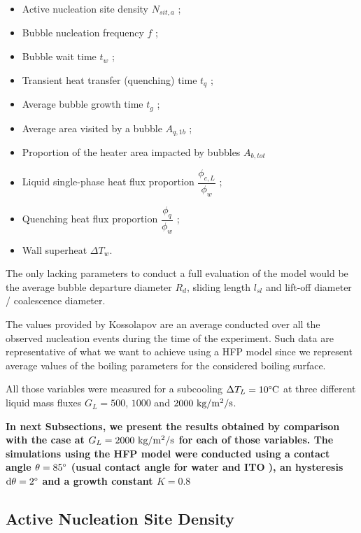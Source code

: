 \begin{itemize}
\item Active nucleation site density $N_{sit,a}$ ;
\item Bubble nucleation frequency $f$ ;
\item Bubble wait time $t_{w}$ ;
\item Transient heat transfer (quenching) time $t_{q}$ ;
\item Average bubble growth time $t_{g}$ ;
\item Average area visited by a bubble $A_{q,1b}$ ;
\item Proportion of the heater area impacted by bubbles $A_{b,tot}$
\item Liquid single-phase heat flux proportion $\dfrac{\phi_{c,L}}{\phi_{w}}$ ;
\item Quenching heat flux proportion $\dfrac{\phi_{q}}{\phi_{w}}$ ;
\item Wall superheat $\Delta T_{w}$.
\end{itemize}

The only lacking parameters to conduct a full evaluation of the model would be the average bubble departure diameter $R_{d}$, sliding length $l_{sl}$ and lift-off diameter / coalescence diameter.

The values provided by Kossolapov are an average conducted over all the observed nucleation events during the time of the experiment. Such data are representative of what we want to achieve using a HFP model since we represent average values of the boiling parameters for the considered boiling surface.

\npar

All those variables were measured for a subcooling $\Delta T_{L} = 10\degree\mathrm{C}$ at three different liquid mass fluxes $G_{L} = 500$, $1000$ and $2000~\text{kg/m$^{2}$/s}$. 

\npar

\textbf{In next Subsections, we present the results obtained by comparison with the case at $G_{L} = 2000\ \debm$ for each of those variables. The simulations using the HFP model were conducted using a contact angle $\theta = 85 \degree$ (usual contact angle for water and ITO \cite{kossolapov_experimental_2021}), an hysteresis $\mathrm{d}\theta = 2 \degree$ and a growth constant $K=0.8$}

 
\subsection{Active Nucleation Site Density}

